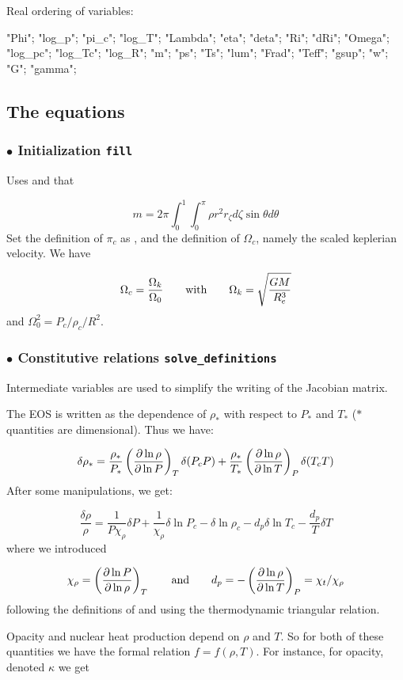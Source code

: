 \noindent Real ordering of variables:

"Phi"; "log\_p"; "pi\_c"; "log\_T"; "Lambda"; "eta"; "deta"; "Ri";
"dRi"; "Omega"; "log\_pc"; "log\_Tc"; "log\_R"; "m"; "ps"; "Ts"; "lum"; "Frad"; "Teff"; "gsup"; "w"; "G"; "gamma"; 

\subsection{The equations}

\subsubsection{$\bullet$ \bf Initialization {\tt fill}}

Uses  and that

\[ m=2\pi\int_0^1\int_0^\pi\rho r^2r_\zeta d\zeta\sin\theta d\theta\]
Set the definition of $\pi_c$ as , and the definition of 
$\Omega_c$, namely the scaled keplerian velocity. We have

\[ \Omega_c=\frac{\Omega_k}{\Omega_0} {\qquad {\rm with}\qquad} \Omega_k=\sqrt{\frac{GM}{R_e^3}}\]
and $\Omega_0^2=P_c/\rho_c/R^2$.

\subsubsection{$\bullet$ \bf Constitutive relations {\tt solve\_definitions}}

Intermediate variables are used to simplify the writing of the Jacobian
matrix.

The EOS is written as the dependence of $\rho_*$ with respect to $P_*$ and
$T_*$ ($*$ quantities are dimensional). Thus we have:

\[ \delta\rho_* = \frac{\rho_*}{P_*}\left(\frac{\partial\ln\rho}{\partial\ln
P}\right)_T\delta(P_cP) + \frac{\rho_*}{T_*}\left(\frac{\partial\ln\rho}{\partial\ln
T}\right)_P\delta(T_cT)\]
After some manipulations, we get:

\[ \frac{\delta\rho}{\rho} = \frac{1}{P\chi_\rho}\delta P +
\frac{1}{\chi_\rho}\delta\ln P_c -\delta\ln\rho_c - d_p\delta\ln T_c -
\frac{d_p}{T}\delta T\]
where we introduced

\[ \chi_\rho = \left(\frac{\partial\ln P}{\partial\ln\rho}\right)_T \qquad {\rm and}\qquad d_p
= -\left(\frac{\partial\ln\rho}{\partial\ln T}\right)_P = \chi_t/\chi_\rho \]
following the definitions of \cite{RSI96} and using the thermodynamic
triangular relation.

\bigskip
Opacity and nuclear heat production depend on $\rho$ and $T$. So for both of
these quantities we have the formal relation $f=f(\rho,T)$. For instance, for
opacity, denoted $\kappa$ we get

